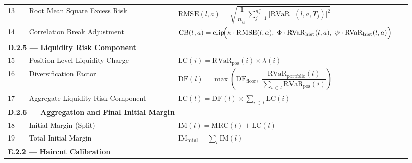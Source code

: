 \documentclass[9pt, a4paper]{extarticle}
\begin{document}
\begin{longtable}{p{0.05\linewidth} p{0.35\linewidth} p{0.52\linewidth}}
13
    & Root Mean Square Excess Risk
    & $\displaystyle \mathrm{RMSE}(l,a) =
       \sqrt{\dfrac{1}{n^{+}_a}
             \sum_{j=1}^{n^{+}_a}
             \bigl[\mathrm{RVaR}^{+}(l,a,T_j)\bigr]^{2}}$ \\[8pt]

14
    & Correlation Break Adjustment
    & $\displaystyle \mathrm{CB}(l,a) = \mathrm{clip}\!\Bigl(
       \kappa \cdot \mathrm{RMSE}(l,a),\;
       \Phi \cdot \mathrm{RVaR}_{\mathrm{hist}}(l,a),\;
       \psi \cdot \mathrm{RVaR}_{\mathrm{hist}}(l,a)
      \Bigr)$ \\[6pt]


\multicolumn{3}{l}{\textbf{D.2.5 — Liquidity Risk Component}} \\[2pt]

15
    & Position-Level Liquidity Charge
    & $\displaystyle \mathrm{LC}(i) =
       \mathrm{RVaR}_{\mathrm{pos}}(i) \times \lambda(i)$ \\[6pt]

16
    & Diversification Factor
    & $\displaystyle \mathrm{DF}(l) =
       \max\!\left(
         \mathrm{DF}_{\mathrm{floor}},\;
         \dfrac{\mathrm{RVaR}_{\mathrm{portfolio}}(l)}
               {\sum_{i \,\in\, l} \mathrm{RVaR}_{\mathrm{pos}}(i)}
       \right)$ \\[8pt]

17
    & Aggregate Liquidity Risk Component
    & $\displaystyle \mathrm{LC}(l) =
       \mathrm{DF}(l) \times \sum_{i \,\in\, l} \mathrm{LC}(i)$ \\[6pt]


\multicolumn{3}{l}{\textbf{D.2.6 — Aggregation and Final Initial Margin}} \\[2pt]

18
    & Initial Margin (Split)
    & $\displaystyle \mathrm{IM}(l) = \mathrm{MRC}(l) + \mathrm{LC}(l)$ \\[6pt]

19
    & Total Initial Margin
    & $\displaystyle \mathrm{IM}_{\mathrm{total}} = \sum_{l} \mathrm{IM}(l)$ \\[6pt]


\multicolumn{3}{l}{\textbf{E.2.2 — Haircut Calibration}} \\[2pt]


\end{longtable}
\end{document}
